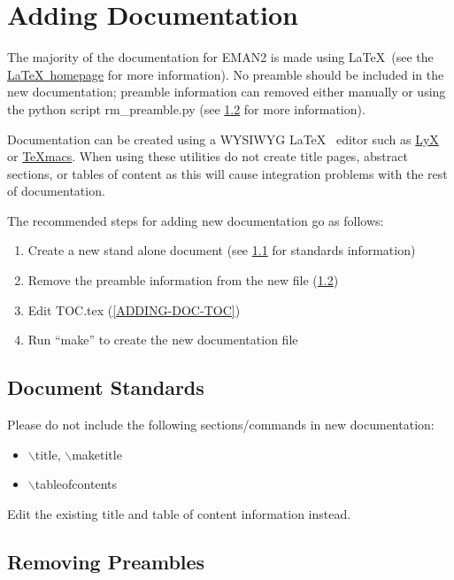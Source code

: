 \section{Adding Documentation} 

The majority of the documentation for EMAN2 is made using \LaTeX ~(see the
\href{http://www.latex-project.org/}{\LaTeX ~homepage} for more
information).  No preamble should be included in the new
documentation; preamble information can removed either manually or
using the python script rm\_preamble.py (see \ref{ADDING-DOC-RMPRE}
for more information).  

Documentation can be created using a WYSIWYG \LaTeX ~ editor such as
\href{http://www.lyx.org/}{LyX} or
\href{http://www.www.texmacs.org/}{TeXmacs}.  When using these
utilities do not create title pages, abstract sections, or tables of
content as this will cause integration problems with the rest of
documentation.

The recommended steps for adding new documentation go as follows:
\begin{enumerate}
  \item Create a new stand alone document (see \ref{ADDING-DOC-STANDS}
  for standards information)
  \item Remove the preamble information from the new file
  (\ref{ADDING-DOC-RMPRE})
  \item Edit TOC.tex (\ref{ADDING-DOC-TOC})
  \item Run ``make'' to create the new documentation file
\end{enumerate}

\subsection{Document Standards} \label{ADDING-DOC-STANDS}
Please do not include the following sections/commands in new documentation:
\begin{itemize}
  \item
    $\backslash$title, $\backslash$maketitle
  \item
    $\backslash$tableofcontents
\end{itemize}
Edit the existing title and table of content information instead.


\subsection{Removing Preambles} \label{ADDING-DOC-RMPRE}

